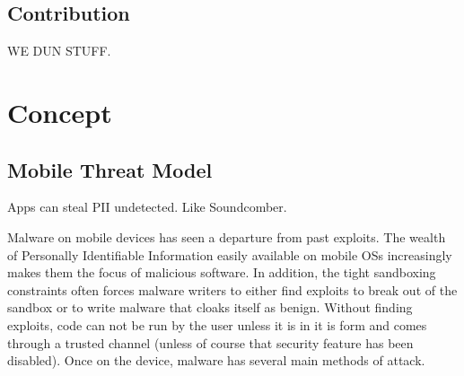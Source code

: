 \documentclass{acm_proc_article-sp}
\begin{document}
\subsection{Contribution}
WE DUN STUFF.





















\section{Concept}
\subsection{Mobile Threat Model}
Apps can steal PII undetected. Like Soundcomber.

Malware on mobile devices has seen a departure from past exploits. The wealth of Personally Identifiable Information easily available on mobile OSs increasingly makes them the focus of malicious software. In addition, the tight sandboxing constraints often forces malware writers to either find exploits to break out of the sandbox or to write malware that cloaks itself as benign. Without finding exploits, code can not be run by the user unless it is in it is form and comes through a trusted channel (unless of course that security feature has been disabled). Once on the device, malware has several main methods of attack.
\end{document}
